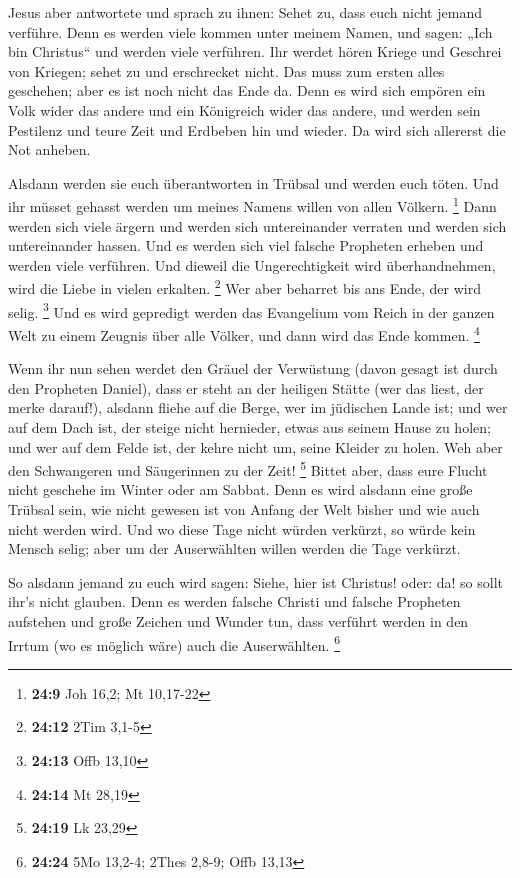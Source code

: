  Jesus aber antwortete und sprach zu ihnen: Sehet zu, dass
euch nicht jemand verführe.  Denn es werden viele kommen
unter meinem Namen, und sagen: „Ich bin Christus`` und werden viele
verführen.  Ihr werdet hören Kriege und Geschrei von
Kriegen; sehet zu und erschrecket nicht. Das muss zum ersten alles
geschehen; aber es ist noch nicht das Ende da.  Denn es wird
sich empören ein Volk wider das andere und ein Königreich wider das
andere, und werden sein Pestilenz und teure Zeit und Erdbeben hin und
wieder.  Da wird sich allererst die Not anheben.

 Alsdann werden sie euch überantworten in Trübsal und werden
euch töten. Und ihr müsset gehasst werden um meines Namens willen von
allen Völkern. \footnote{\textbf{24:9} Joh 16,2; Mt 10,17-22}
 Dann werden sich viele ärgern und werden sich
untereinander verraten und werden sich untereinander hassen.
 Und es werden sich viel falsche Propheten erheben und
werden viele verführen.  Und dieweil die Ungerechtigkeit
wird überhandnehmen, wird die Liebe in vielen erkalten. \footnote{\textbf{24:12}
  2Tim 3,1-5}  Wer aber beharret bis ans Ende, der wird
selig. \footnote{\textbf{24:13} Offb 13,10}  Und es wird
gepredigt werden das Evangelium vom Reich in der ganzen Welt zu einem
Zeugnis über alle Völker, und dann wird das Ende kommen. \footnote{\textbf{24:14}
  Mt 28,19}

 Wenn ihr nun sehen werdet den Gräuel der Verwüstung (davon
gesagt ist durch den Propheten Daniel), dass er steht an der heiligen
Stätte (wer das liest, der merke darauf!),  alsdann fliehe
auf die Berge, wer im jüdischen Lande ist;  und wer auf dem
Dach ist, der steige nicht hernieder, etwas aus seinem Hause zu holen;
 und wer auf dem Felde ist, der kehre nicht um, seine
Kleider zu holen.  Weh aber den Schwangeren und Säugerinnen
zu der Zeit! \footnote{\textbf{24:19} Lk 23,29}  Bittet
aber, dass eure Flucht nicht geschehe im Winter oder am Sabbat.
 Denn es wird alsdann eine große Trübsal sein, wie nicht
gewesen ist von Anfang der Welt bisher und wie auch nicht werden wird.
 Und wo diese Tage nicht würden verkürzt, so würde kein
Mensch selig; aber um der Auserwählten willen werden die Tage verkürzt.

 So alsdann jemand zu euch wird sagen: Siehe, hier ist
Christus! oder: da! so sollt ihr's nicht glauben.  Denn es
werden falsche Christi und falsche Propheten aufstehen und große Zeichen
und Wunder tun, dass verführt werden in den Irrtum (wo es möglich wäre)
auch die Auserwählten. \footnote{\textbf{24:24} 5Mo 13,2-4; 2Thes 2,8-9;
  Offb 13,13}

